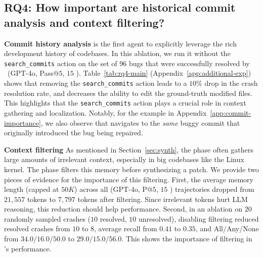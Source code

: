 \subsection{RQ4: How important are historical commit analysis and context filtering?}
\label{sec:rq4}


\noindent\textbf{Commit history analysis}
\cresearcher{} is the first agent to explicitly leverage the rich development history of codebases.
In this ablation, we run it without the \texttt{search\_commits} action on the set of $96$ bugs that were successfully resolved by \cresearcher{}~(GPT-4o, Pass@$5$, $15$ \maxcalls{}). 
Table~\ref{tab:rq4-main} (Appendix~\ref{app:additional-exp}) shows that removing the \texttt{search\_commits} action leads to a $10\%$ drop in the crash resolution rate,
and decreases the ability to edit the ground-truth modified files.
This highlights that the \texttt{search\_commits} action plays a crucial role 
in context gathering and localization.
Notably, for the example in Appendix~\ref{app:commit-importance}, we also observe that \cresearcher{} navigates to the \emph{same} buggy commit that originally introduced the bug being repaired.

\noindent\textbf{Context filtering}
As mentioned in Section~\ref{sec:synth}, the \analysisphase{} phase often gathers large amounts of irrelevant context, especially in big codebases like the Linux kernel.
The \synthesisphase{} phase filters this memory before synthesizing a patch.
We provide two pieces of evidence for the importance of this filtering.
First, the average memory length (capped at $50K$) across all \cresearcher{} (GPT-4o, P@$5$, $15$ \maxcalls{}) trajectories  dropped from $21,557$ tokens to $7,797$ tokens after filtering.
Since irrelevant tokens hurt LLM reasoning, this reduction should help performance.
Second, in an ablation on $20$ randomly sampled crashes ($10$ resolved, $10$ unresolved), disabling filtering reduced resolved crashes from $10$ to $8$, average recall from $0.41$ to $0.35$, and All/Any/None from $34.0/16.0/50.0$ to $29.0/15.0/56.0$.
This shows the importance of filtering in \cresearcher{}'s performance.
